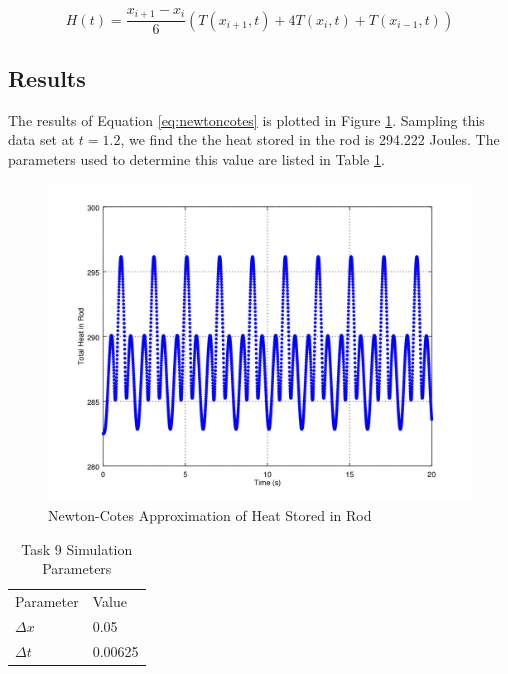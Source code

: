 \documentclass[12pt]{amsart}
\begin{document}
\begin{equation}
H(t) = \frac{x_{i+1}-x_i}{6} (T(x_{i+1},t) + 4T(x_i,t) + T(x_{i-1},t))
\label{eq:newtoncotes}
\end{equation}

\subsection{Results}
The results of Equation \ref{eq:newtoncotes} is plotted in Figure \ref{fig:totalheat}. Sampling this data set at $ t = 1.2$, we find the the heat stored in the rod is 294.222 Joules. The parameters used to determine this value are listed in Table \ref{task9param}. 

\begin{center}
\begin{figure}
\includegraphics[scale=0.7]{task9plot}
\caption{Newton-Cotes Approximation of Heat Stored in Rod}
\label{fig:totalheat}
\end{figure}
\end{center}

\begin{table}[]
\centering
\caption{Task 9 Simulation Parameters}
\label{task9param}
\begin{tabular}{ll}
Parameter            & Value \\
$\Delta x$           & 0.05  \\
$\Delta t$           & 0.00625 
\end{tabular}
\end{table}
\end{document}
